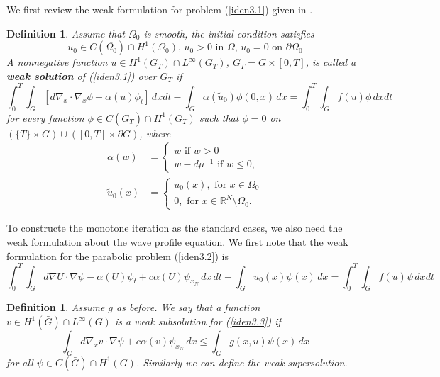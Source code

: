 \documentclass[12pt, a4paper]{article}
\newtheorem{defn}[thm]{Definition}
\numberwithin{equation}{section}
\newcommand{\R}{\mathbb{R}}
\newcommand{\named}[1]{\textnormal{\textbf{#1}}}
\begin{document}
\begin{CJK}{UTF8}{bkai}
	We first review the weak formulation for problem (\ref{iden3.1}) given in \cite{DG2012}.
\begin{defn}
	Assume that $\Omega_0$ is smooth, the initial condition satisfies
\begin{equation}
	u_0\in C(\overline{\Omega_0})\cap H^1(\Omega_0),\,u_0>0 \mbox{ in } \Omega,\, u_0=0 \mbox{ on }\partial\Omega_0
\end{equation}
A nonnegative function $u\in H^1(G_T)\cap L^\infty(G_T)$, $G_T=G\times[0,T]$, is called a \named{weak solution} of (\ref{iden3.1})  over $G_T$ if
\begin{equation}	\int_0^T\int_G[d\nabla_x\cdot\nabla_x\phi-\alpha(u)\phi_t]\,dxdt-\int_G\alpha(\tilde{u}_0)\phi(0,x)\,dx=\int_0^T\int_Gf(u)\phi\,dxdt
\end{equation}
for every function $\phi\in C(\overline{G_T})\cap H^1(G_T)$ such that $\phi=0$ on $(\{T\}\times G)\cup([0,T]\times\partial G)$, where
\begin{align}
	\alpha(w)&=\begin{cases}
		w\mbox{ if }w> 0\\
		w-d\mu^{-1}\mbox{ if }w\leq 0,
	\end{cases}\\
	\tilde{u}_0(x)&=\begin{cases}
		u_0(x),\mbox{ for }x\in\Omega_0\\
		0, \mbox{ for }x\in \R^N\setminus\Omega_0.
	\end{cases}
\end{align}
\end{defn}
	To constructe the monotone iteration as the standard cases, we also need the  weak formulation about the wave profile equation. We first note that the weak formulation for the parabolic problem (\ref{iden3.2}) is
\begin{equation}
	\int_0^T\int_Gd\nabla U\cdot\nabla\psi-\alpha(U)\psi_t+c\alpha(U)\psi_{x_N}\,dx\,dt-\int_Gu_0(x)\psi(x)\,dx=\int_0^T\int_G f(u)\psi\,dxdt
\end{equation}
	
\begin{defn}
	Assume $g$ as before. We say that a function $v\in H^1(\bar{G})\cap L^\infty(G)$ is a weak subsolution for (\ref{iden3.3}) if
\begin{equation}
	\int_Gd\nabla_xv\cdot\nabla\psi+c\alpha(v)\psi_{x_N}\,dx\leq \int_Gg(x,u)\psi(x)\,dx
\end{equation}
for all $\psi\in C(\bar{G})\cap H^1(G)$. Similarly we can define the weak supersolution.
\end{defn}


\end{CJK}
\end{document}
